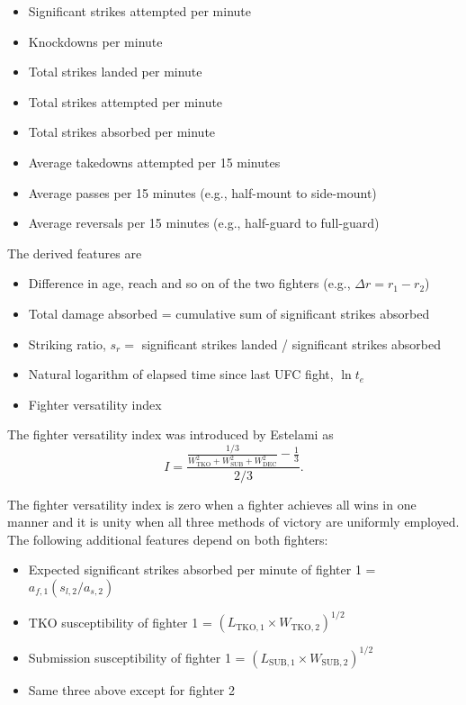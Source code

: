 \begin{itemize}[noitemsep]
  \item Significant strikes attempted per minute
  \item Knockdowns per minute
  \item Total strikes landed per minute
  \item Total strikes attempted per minute
  \item Total strikes absorbed per minute
  \item Average takedowns attempted per 15 minutes
  \item Average passes per 15 minutes (e.g., half-mount to side-mount)
  \item Average reversals per 15 minutes (e.g., half-guard to full-guard)
\end{itemize}

\noindent
The derived features are

\begin{itemize}[noitemsep]
  \item Difference in age, reach and so on of the two fighters (e.g., $\Delta r=r_1-r_2$)
  \item Total damage absorbed = cumulative sum of significant strikes absorbed
  \item Striking ratio, $s_r =$ significant strikes landed / significant strikes absorbed
  \item Natural logarithm of elapsed time since last UFC fight, $\ln t_e$
  \item Fighter versatility index
\end{itemize}

\noindent
The fighter versatility index was introduced by Estelami as
\begin{equation}
I = \frac{\frac{1/3}{W_{\textrm{TKO}}^2+W_{\textrm{SUB}}^2+W_{\textrm{DEC}}^2}-\frac{1}{3}}{2/3}.
\end{equation}

\noindent
The fighter versatility index is zero when a fighter achieves all wins in one manner and
it is unity when all three methods of victory are uniformly employed.\\

\noindent
The following additional features depend on both fighters:

\begin{itemize}[noitemsep]
  \item Expected significant strikes absorbed per minute of fighter 1 = $a_{f,1} (s_{l,2}/a_{s,2})$
  \item TKO susceptibility of fighter 1 = $(L_{\textrm{TKO},1} \times W_{\textrm{TKO},2})^{1/2}$
  \item Submission susceptibility of fighter 1 = $(L_{\textrm{SUB},1} \times W_{\textrm{SUB},2})^{1/2}$
  \item Same three above except for fighter 2
\end{itemize}

